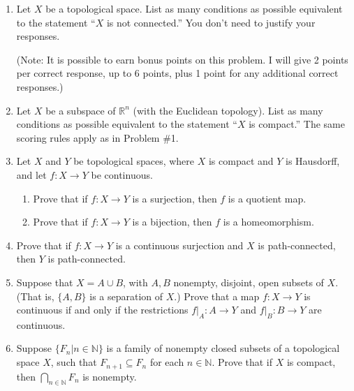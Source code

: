 \documentclass[12pt]{article}
\newcommand{\points}[1]{\marginpar{\hspace{24pt}[#1]}}
\newcommand{\R}{\mathbb{R}}
\newcommand{\N}{\mathbb{N}}
\begin{document}
\begin{enumerate}
\item Let $X$ be a topological space. List as many conditions as possible equivalent to the statement ``$X$ is not connected.'' \points{6} You don't need to justify your responses.

(Note: It is possible to earn bonus points on this problem. I will give 2 points per correct response, up to 6 points, plus 1 point for any additional correct responses.)

\vspace{3.5in}

\item Let $X$ be a subspace of $\R^n$ (with the Euclidean topology). List as many conditions as possible equivalent to the statement ``$X$ is compact.'' \points{6} The same scoring rules apply as in Problem \#1.

\newpage

\item Let $X$ and $Y$ be topological spaces, where $X$ is compact and $Y$ is Hausdorff, and let $f:X\to Y$ be continuous.
\begin{enumerate}
 \item Prove that if $f:X\to Y$ is a surjection, then $f$ is a quotient map. \points{5}

\vspace{3.5in}

 \item Prove that if $f:X\to Y$ is a bijection, then $f$ is a homeomorphism. \points{3}



\end{enumerate}
\newpage
 \item Prove that if $f:X\to Y$ is a continuous surjection and $X$ is path-connected, then $Y$ is path-connected. \points{5}

\vspace{3.5in}

 \item Suppose that $X=A\cup B$, with $A,B$ nonempty, disjoint, open subsets of $X$. (That is, $\{A,B\}$ is a separation of $X$.) Prove that a map $f:X\to Y$ is continuous if and only if the restrictions $f|_A:A\to Y$ and $f|_B:B\to Y$ are continuous. \points{5}

\newpage

 \item Suppose $\{F_n | n\in\N\}$ is a family of nonempty closed subsets of a topological space $X$, such that $F_{n+1}\subseteq F_n$ for each $n\in \N$. Prove that if $X$ is compact, then $\bigcap_{n\in\N}F_n$ is nonempty. \points{6}


\end{enumerate}
\end{document}

